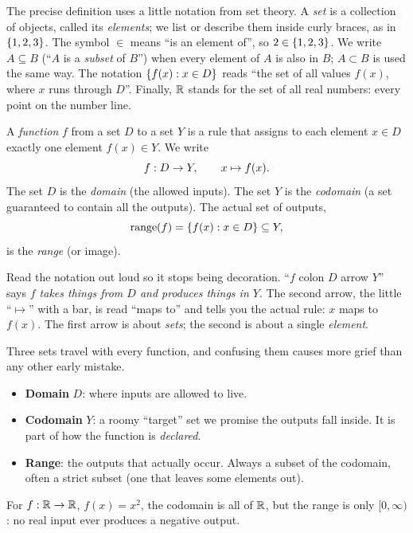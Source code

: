 The precise definition uses a little notation from set theory. A \emph{set} is a
collection of objects, called its \emph{elements}; we list or describe them inside
curly braces, as in $\{1, 2, 3\}$. The symbol $\in$ means ``is an element of'', so
$2 \in \{1,2,3\}$. We write $A \subseteq B$ (``$A$ is a \emph{subset} of $B$'') when
every element of $A$ is also in $B$; $A \subset B$ is used the same way. The
notation $\{ f(x) : x \in D \}$ reads ``the set of all values $f(x)$, where $x$
runs through $D$''. Finally, $\mathbb{R}$ stands for the set of all real numbers: every
point on the number line.

\begin{definition}[Function]
\label{ch02:def-function}
A \emph{function} $f$ from a set $D$ to a set $Y$ is a rule that assigns to each
element $x \in D$ exactly one element $f(x) \in Y$. We write
\[
  f : D \to Y, \qquad x \mapsto f(x).
\]
The set $D$ is the \emph{domain} (the allowed inputs). The set $Y$ is the
\emph{codomain} (a set guaranteed to contain all the outputs). The actual set of
outputs,
\[
  \operatorname{range}(f) = \{ f(x) : x \in D \} \subseteq Y,
\]
is the \emph{range} (or image).
\end{definition}

Read the notation out loud so it stops being decoration. ``$f$ colon $D$ arrow
$Y$'' says \emph{$f$ takes things from $D$ and produces things in $Y$}. The
second arrow, the little ``$\mapsto$'' with a bar, is read ``maps to'' and tells
you the actual rule: $x$ maps to $f(x)$. The first arrow is about \emph{sets}; the
second is about a single \emph{element}.

\begin{focusbox}
Three sets travel with every function, and confusing them causes more grief than
any other early mistake.
\begin{itemize}
  \item \textbf{Domain} $D$: where inputs are allowed to live.
  \item \textbf{Codomain} $Y$: a roomy ``target'' set we promise the outputs fall
        inside. It is part of how the function is \emph{declared}.
  \item \textbf{Range}: the outputs that actually occur. Always a subset of the
        codomain, often a strict subset (one that leaves some elements out).
\end{itemize}
For $f:\mathbb{R}\to\mathbb{R}$, $f(x)=x^2$, the codomain is all of $\mathbb{R}$, but the range is only
$[0,\infty)$: no real input ever produces a negative output.
\end{focusbox}

